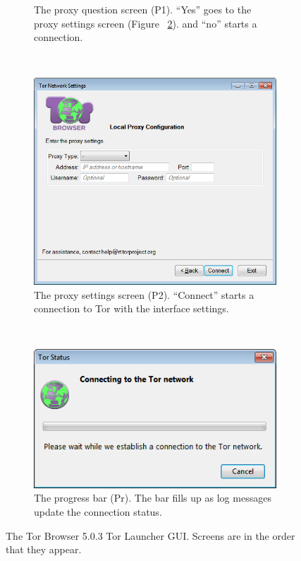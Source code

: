 \documentclass[USenglish,oneside,twocolumn]{article}
\begin{document}
\begin{figure}
\begin{subfigure}[b]{0.30\textwidth}
	\centering\captionsetup{width=1.5\linewidth}%
	\caption{The proxy question screen (P1). ``Yes'' goes to the proxy settings screen (Figure ~\ref{fig:old-proxy-yes}). and ``no'' starts a connection.}
	\label{fig:old-proxy}
\end{subfigure}
~~~~~~~~~~
\begin{subfigure}[b]{0.30\textwidth}
	\includegraphics[width=\textwidth]{screenshots/OLD-proxyYES.png}
	\centering\captionsetup{width=1.5\linewidth}%
	\caption{The proxy settings screen (P2). ``Connect'' starts a connection to Tor with the interface settings.}
	\label{fig:old-proxy-yes}
\end{subfigure}
~~~~~~~~~~~~~~~~~~~~~~~~~
\begin{subfigure}[b]{0.30\textwidth}
	\includegraphics[width=\textwidth]{screenshots/OLD-progress.png}
	\centering\captionsetup{width=1.5\linewidth}%
	\caption{The progress bar (Pr). The bar fills up as log messages update the connection status. }
	\label{fig:old-progress}
\end{subfigure}
\caption{
The Tor Browser 5.0.3 Tor Launcher GUI. Screens are in the order that they appear. 
}
\label{fig:old-interface}
\end{figure} 
\end{document}
